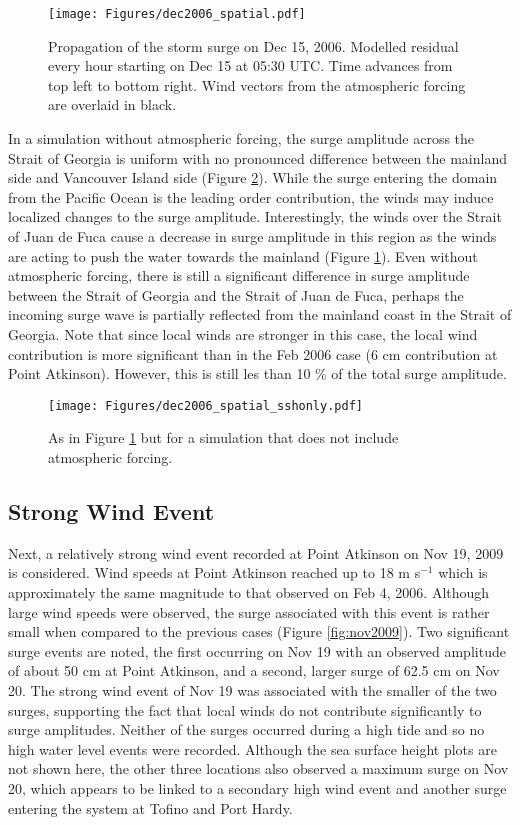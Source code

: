 \documentclass[letterpaper]{tATO2e}
\begin{document}
\begin{figure}
\centering
\texttt{[image: Figures/dec2006\_spatial.pdf]}
\caption{Propagation of the storm surge on Dec 15, 2006. Modelled residual every hour starting on Dec 15 at 05:30 UTC. Time advances from top left to bottom right. Wind vectors from the atmospheric forcing are overlaid in black.}
\label{fig:spatial}
\end{figure}

In a simulation without atmospheric forcing, the surge amplitude across the Strait of Georgia is uniform with no pronounced difference between the mainland side and Vancouver Island side (Figure \ref{fig:spatial_sshonly}). While the surge entering the domain from the Pacific Ocean is the leading order contribution, the winds may induce localized changes to the surge amplitude. Interestingly, the winds over the Strait of Juan de Fuca cause a decrease in surge amplitude in this region as the winds are acting to push the water towards the mainland {\color{red}(Figure \ref{fig:spatial})}.  {\color{red} Even without atmospheric forcing, there is still a significant difference in surge amplitude between the Strait of Georgia and the Strait of Juan de Fuca, perhaps the incoming surge wave is partially reflected from the mainland coast in the Strait of Georgia. Note that since local winds are stronger in this case, the local wind contribution is more significant than in the Feb 2006 case (6 cm contribution at Point Atkinson). However, this is still les than 10 \% of the total surge amplitude. } 

\begin{figure}
\centering
\texttt{[image: Figures/dec2006\_spatial\_sshonly.pdf]}
\caption{As in Figure \ref{fig:spatial} but for a simulation that does not include atmospheric forcing. }
\label{fig:spatial_sshonly}
\end{figure}

\subsection{Strong Wind Event}\label{sec:wind}
Next, a relatively strong wind event recorded at Point Atkinson on Nov 19, 2009 is considered. {\color{red} Wind speeds at Point Atkinson reached up to 18 m s$^{-1}$ which is approximately the same magnitude to that observed on Feb 4, 2006.}  Although large wind speeds were observed, the surge associated with this event is rather small when compared to the previous cases (Figure \ref{fig:nov2009}). Two significant surge events are noted, the first occurring on Nov 19 with an observed amplitude of about 50 cm at Point Atkinson, and a second, larger surge of 62.5 cm on Nov 20. {\color{red} The strong wind event of Nov 19 was associated with the smaller of the two surges, supporting the fact that local winds do not contribute significantly to surge amplitudes.}  Neither of the surges occurred during a high tide and so no high water level events were recorded. Although {\color{red} the sea surface height plots are} not shown here, the other three locations also observed a maximum surge on Nov 20, which appears to be linked to a secondary high wind event and another surge entering the system at Tofino and Port Hardy. 
\end{document}
